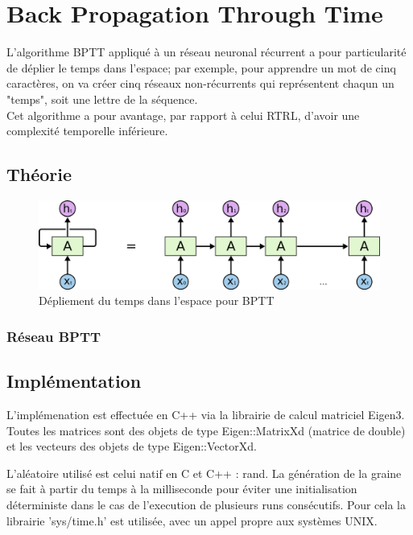 
\chapter{Back Propagation Through Time}
L'algorithme BPTT appliqué à un réseau neuronal récurrent a pour particularité
de déplier le temps dans l'espace; par exemple, pour apprendre un mot de cinq
caractères, on va créer cinq réseaux non-récurrents qui représentent chaqun un
"temps", soit une lettre de la séquence. \\

Cet algorithme a pour avantage, par rapport à celui RTRL, d'avoir une
complexité temporelle inférieure.

\section{Théorie}

\begin{figure}[!ht]
\begin{center}
\includegraphics[scale=0.2]{images/bptt.png}
\end{center}
\caption{Dépliement du temps dans l'espace pour BPTT}
\end{figure}


\subsection{Réseau BPTT}

\section{Implémentation}

L'implémenation est effectuée en C++ via la librairie de calcul matriciel
Eigen3. Toutes les matrices sont des objets de type Eigen::MatrixXd (matrice de
double) et les vecteurs des objets de type Eigen::VectorXd.

\medskip

L'aléatoire utilisé est celui natif en C et C++ : rand.
La génération de la graine se fait à partir du temps à la milliseconde pour
éviter une initialisation déterministe dans le cas de l'execution de plusieurs
runs consécutifs. Pour cela la librairie 'sys/time.h' est utilisée, avec un
appel propre aux systèmes UNIX.

